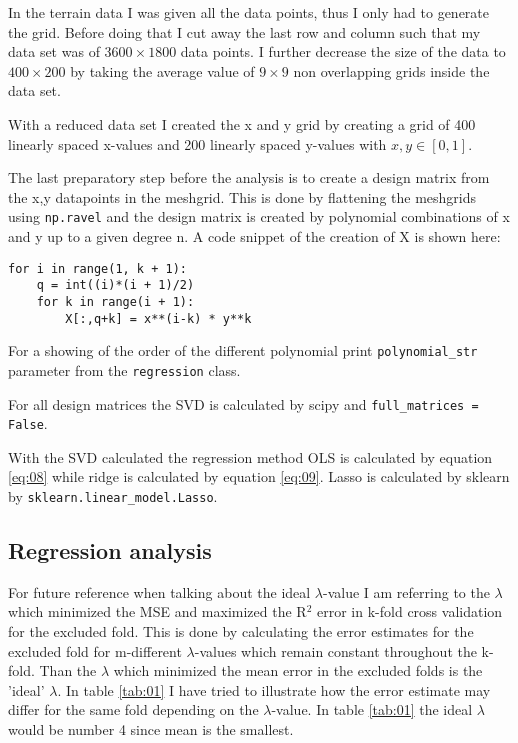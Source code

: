 \documentclass[uio,jmp,amsmath,amssymb,reprint,nofootinbib]{revtex4-1}
\numberwithin{equation}{section}
\begin{document}
In the terrain data I was given all the data points, thus I only had to generate the grid. Before doing that I cut away the last row and column such that my data set was of \(3600\times 1800\) data points. I further decrease the size of the data to \(400\times 200\) by taking the average value of \(9\times 9\) non overlapping grids inside the data set.

With a reduced data set I created the x and y grid by creating a grid of 400 linearly spaced x-values and 200 linearly spaced y-values with \(x, y \in [0, 1]\).

The last preparatory step before the analysis is to create a design matrix from the x,y datapoints in the meshgrid. This is done by flattening the meshgrids using \texttt{np.ravel} and the design matrix is created  by polynomial combinations of x and y up to a given degree n. A code snippet of the creation of X is shown here:
\begin{verbatim}
for i in range(1, k + 1):
    q = int((i)*(i + 1)/2)
    for k in range(i + 1):
        X[:,q+k] = x**(i-k) * y**k
\end{verbatim}
For a showing of the order of the different polynomial print \texttt{polynomial\_str} parameter from the \texttt{regression} class.

For all design matrices the SVD is calculated by scipy and \texttt{full\_matrices = False}.

With the SVD calculated the regression method OLS is calculated by equation \ref{eq:08} while ridge is calculated by equation \ref{eq:09}. Lasso is calculated by sklearn by \texttt{sklearn.linear\_model.Lasso}.


\subsection{Regression analysis}

For future reference when talking about the ideal \(\lambda\)-value I am referring to the \(\lambda\) which minimized the MSE and maximized the R\(^2\) error in k-fold cross validation for the excluded fold. This is done by calculating the error estimates for the excluded fold for m-different \(\lambda\)-values which remain constant throughout the k-fold. Than the \(\lambda\) which minimized the mean error in the excluded folds is the 'ideal' \(\lambda\). In table \ref{tab:01} I have tried to illustrate how the error estimate may differ for the same fold depending on the \(\lambda\)-value. In table \ref{tab:01} the ideal \(\lambda\) would be number 4 since mean is the smallest. 
\end{document}
